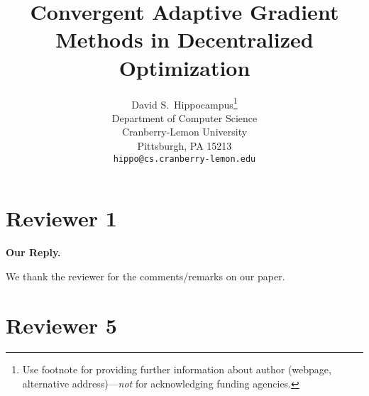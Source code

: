 \documentclass{article} %
\title{Convergent Adaptive Gradient Methods in Decentralized Optimization\vspace{-0.15in}}
\begin{document}
\maketitle


\author{%
  David S.~Hippocampus\thanks{Use footnote for providing further information
    about author (webpage, alternative address)---\emph{not} for acknowledging
    funding agencies.} \\
  Department of Computer Science\\
  Cranberry-Lemon University\\
  Pittsburgh, PA 15213 \\
  \texttt{hippo@cs.cranberry-lemon.edu} \\
}





\section{Reviewer 1}
\vspace{-0.1in}


\textbf{Our Reply.}

We thank the reviewer for the comments/remarks on our paper.



\section{Reviewer 5}
\vspace{-0.1in}
\end{document}
